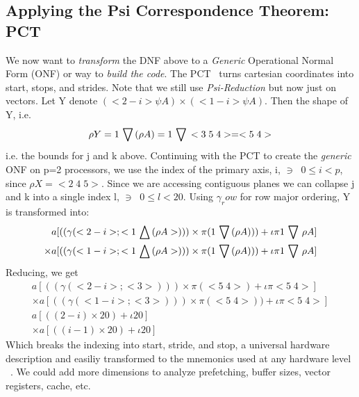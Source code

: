 \subsection* {Applying the Psi Correspondence Theorem: PCT}
We now want to {\em transform} the DNF above to a {\em Generic} Operational Normal Form (ONF) or way 
to {\em build the code}.  The PCT~\cite{muljen94} turns cartesian coordinates into start, stops, and strides.
Note that we still use {\em Psi-Reduction} but now just on vectors.  
Let Y denote $(<2-i> \psi A ) \times ( <1-i> \psi A)$. Then the shape of Y, i.e.
\begin{eqnarray}
\rho Y= 1 \,\bigtriangledown\, (\rho A) = 1 \,\bigtriangledown\, <3\;5\;4> = <5\;4>
\end{eqnarray}
i.e. the bounds for j and k  above.
Continuing with the PCT to create the {\em generic} ONF on p=2 processors, we use the index of the primary axis, i, $\ni\;\;0 \leq  i < p$, since $\rho X = <2\;4\;5>$.
Since we are accessing contiguous planes we can collapse j and k into a single index l, $\ni \;\; 0 \leq l <20$.
Using $\gamma_row$ for row major ordering, Y is transformed into:
\small
\begin{eqnarray}
a[ (( \gamma(<2-i >; <1 \,\bigtriangleup\, (\rho A>))) \times \pi ( 1 \,\bigtriangledown\, (\rho A))   )  + \iota \pi 1 \,\bigtriangledown\, \rho A  ] \nonumber \\
\times a[ (( \gamma(<1-i >; <1 \,\bigtriangleup\, (\rho A>))) \times \pi ( 1 \,\bigtriangledown\, (\rho A))   )  + \iota \pi 1 \,\bigtriangledown\, \rho A  ] 
\end{eqnarray}
Reducing, we get
\begin{eqnarray}
a[ (( \gamma(<2-i >; <3>))) \times \pi ( <5\;4>)  + \iota \pi <5\;4> ] \nonumber \\
\times a[ (( \gamma(<1-i >; <3>))) \times \pi ( <5\;4>)   )  + \iota \pi <5\;4>  ]\nonumber \\
a[( (2-i) \times  20)  + \iota 20 ] \nonumber \\
\times a[( (i-1) \times 20 )  + \iota 20 ]
\end{eqnarray}
\normalsize
Which breaks the indexing into start, stride, and stop, a universal hardware description and easiliy transformed
to the mnemonics used at any hardware level ~\cite{fftharry}.
We could add more dimensions to analyze prefetching, buffer sizes, vector registers, cache, etc.
